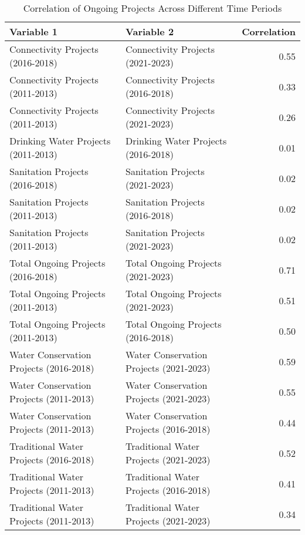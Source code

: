 \begin{table}[!h]
\centering
\caption{Correlation of Ongoing Projects Across Different Time Periods}
\centering
\fontsize{6}{8}\selectfont
\begin{tabular}[t]{llr}
\toprule
Variable 1 & Variable 2 & Correlation\\
\midrule
Connectivity Projects (2016-2018) & Connectivity Projects (2021-2023) & 0.55\\
Connectivity Projects (2011-2013) & Connectivity Projects (2016-2018) & 0.33\\
Connectivity Projects (2011-2013) & Connectivity Projects (2021-2023) & 0.26\\
Drinking Water Projects (2011-2013) & Drinking Water Projects (2016-2018) & 0.01\\
Sanitation Projects (2016-2018) & Sanitation Projects (2021-2023) & 0.02\\
\addlinespace
Sanitation Projects (2011-2013) & Sanitation Projects (2016-2018) & 0.02\\
Sanitation Projects (2011-2013) & Sanitation Projects (2021-2023) & 0.02\\
Total Ongoing Projects (2016-2018) & Total Ongoing Projects (2021-2023) & 0.71\\
Total Ongoing Projects (2011-2013) & Total Ongoing Projects (2021-2023) & 0.51\\
Total Ongoing Projects (2011-2013) & Total Ongoing Projects (2016-2018) & 0.50\\
\addlinespace
Water Conservation Projects (2016-2018) & Water Conservation Projects (2021-2023) & 0.59\\
Water Conservation Projects (2011-2013) & Water Conservation Projects (2021-2023) & 0.55\\
Water Conservation Projects (2011-2013) & Water Conservation Projects (2016-2018) & 0.44\\
Traditional Water Projects (2016-2018) & Traditional Water Projects (2021-2023) & 0.52\\
Traditional Water Projects (2011-2013) & Traditional Water Projects (2016-2018) & 0.41\\
\addlinespace
Traditional Water Projects (2011-2013) & Traditional Water Projects (2021-2023) & 0.34\\
\bottomrule
\end{tabular}
\end{table}
